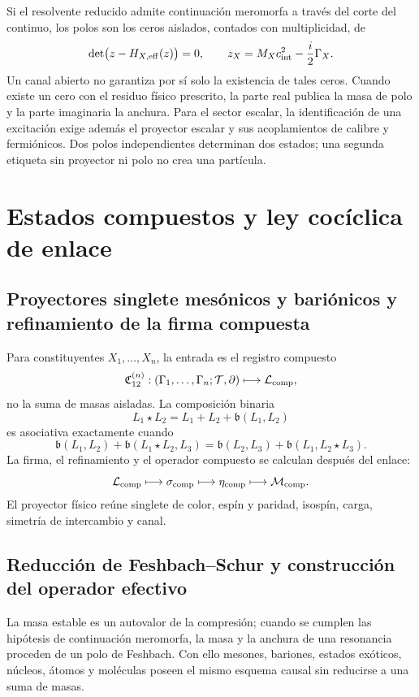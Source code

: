 Si el resolvente reducido admite continuación meromorfa a través del corte del
continuo, los polos son los ceros aislados, contados con multiplicidad, de
\[
 \det\bigl(z-H_{X,\rm eff}(z)\bigr)=0,
 \qquad
 z_X=M_X c_{\rm int}^2-\frac{i}{2}\Gamma_X.
\]
Un canal abierto no garantiza por sí solo la existencia de tales ceros. Cuando
existe un cero con el residuo físico prescrito, la parte real publica la masa de
polo y la parte imaginaria la anchura. Para el
sector escalar, la identificación de una excitación exige además el proyector
escalar y sus acoplamientos de calibre y fermiónicos. Dos polos independientes
determinan dos estados; una segunda etiqueta sin proyector ni polo no crea una
partícula.

\section{Estados compuestos y ley cocíclica de enlace}

\subsection{Proyectores singlete mesónicos y bariónicos y refinamiento de la firma compuesta}

Para constituyentes \(X_1,\ldots,X_n\), la entrada es el registro compuesto
\[
 \mathfrak C_{12}^{(n)}:
 (\Gamma_1,\ldots,\Gamma_n;\mathcal T,\partial)
 \longmapsto\mathcal L_{\rm comp},
\]
no la suma de masas aisladas. La composición binaria
\[
 L_1\star L_2=L_1+L_2+\mathfrak b(L_1,L_2)
\]
es asociativa exactamente cuando
\[
 \mathfrak b(L_1,L_2)+\mathfrak b(L_1\star L_2,L_3)
 =\mathfrak b(L_2,L_3)+\mathfrak b(L_1,L_2\star L_3).
\]
La firma, el refinamiento y el operador compuesto se calculan después del
enlace:
\[
 \mathcal L_{\rm comp}\longmapsto\sigma_{\rm comp}
 \longmapsto\eta_{\rm comp}\longmapsto\mathcal M_{\rm comp}.
\]
El proyector físico reúne singlete de color, espín y paridad, isospín, carga,
simetría de intercambio y canal.

\subsection{Reducción de Feshbach--Schur y construcción del operador efectivo}

La masa estable es un autovalor de la
compresión; cuando se cumplen las hipótesis de continuación meromorfa, la masa
y la anchura de una resonancia proceden de un polo de Feshbach. Con ello
mesones, bariones, estados exóticos, núcleos, átomos y
moléculas poseen el mismo esquema causal sin reducirse a una suma de masas.


